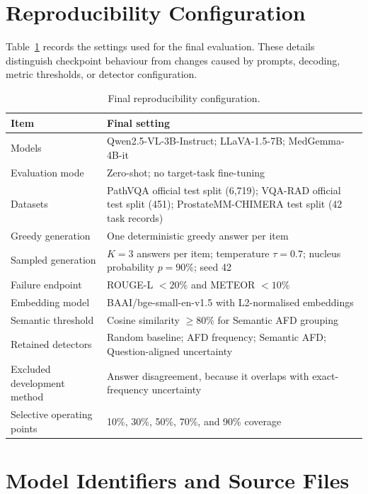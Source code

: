 \section*{Reproducibility Configuration}

Table~\ref{tab:reproducibility-configuration} records the settings used for the final evaluation. These details distinguish checkpoint behaviour from changes caused by prompts, decoding, metric thresholds, or detector configuration.

\begin{table}[htbp]
    \centering
    \caption{Final reproducibility configuration.}
    \label{tab:reproducibility-configuration}
    \small
    \begin{tabularx}{\textwidth}{lX}
        \toprule
        Item & Final setting \\
        \midrule
        Models & Qwen2.5-VL-3B-Instruct; LLaVA-1.5-7B; MedGemma-4B-it \\
        Evaluation mode & Zero-shot; no target-task fine-tuning \\
        Datasets & PathVQA official test split (6,719); VQA-RAD official test split (451); ProstateMM-CHIMERA test split (42 task records) \\
        Greedy generation & One deterministic greedy answer per item \\
        Sampled generation & $K=3$ answers per item; temperature $\tau=0.7$; nucleus probability $p=90\%$; seed 42 \\
        Failure endpoint & ROUGE-L $<20\%$ and METEOR $<10\%$ \\
        Embedding model & BAAI/bge-small-en-v1.5 with L2-normalised embeddings \\
        Semantic threshold & Cosine similarity $\geq80\%$ for Semantic AFD grouping \\
        Retained detectors & Random baseline; AFD frequency; Semantic AFD; Question-aligned uncertainty \\
        Excluded development method & Answer disagreement, because it overlaps with exact-frequency uncertainty \\
        Selective operating points & 10\%, 30\%, 50\%, 70\%, and 90\% coverage \\
        \bottomrule
    \end{tabularx}
\end{table}

\section*{Model Identifiers and Source Files}

